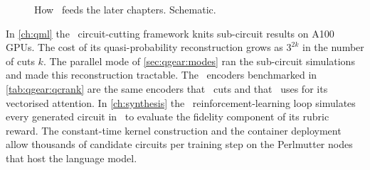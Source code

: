 \begin{figure}[htbp]
\centering
{}
\caption{How \qgear\ feeds the later chapters. Schematic.}
\label{fig:qgear:relation}
\end{figure}

In \cref{ch:qml} the \shardq\ circuit-cutting framework knits sub-circuit results on A100 GPUs. The cost of its quasi-probability reconstruction grows as $3^{2k}$ in the number of cuts $k$. The parallel mode of \cref{sec:qgear:modes} ran the sub-circuit simulations and made this reconstruction tractable. The \qcrank\ encoders benchmarked in \cref{tab:qgear:qcrank} are the same encoders that \shardq\ cuts and that \vqt\ uses for its vectorised attention. In \cref{ch:synthesis} the \rubriq\ reinforcement-learning loop simulates every generated circuit in \cudaq\ to evaluate the fidelity component of its rubric reward. The constant-time kernel construction and the container deployment allow thousands of candidate circuits per training step on the Perlmutter nodes that host the language model.

